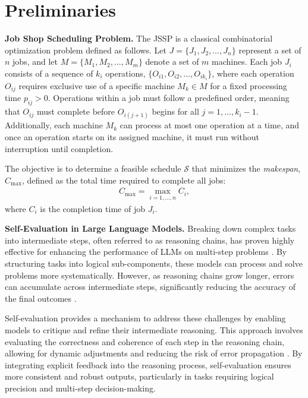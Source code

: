\section{Preliminaries}
\label{sec:preliminaries}

\textbf{Job Shop Scheduling Problem.} The JSSP is a classical combinatorial optimization problem defined as follows. Let $J = \{J_1, J_2, \dots, J_n\}$ represent a set of $n$ jobs, and let $M = \{M_1, M_2, \dots, M_m\}$ denote a set of $m$ machines. Each job $J_i$ consists of a sequence of $k_i$ operations, $\{O_{i1}, O_{i2}, \dots, O_{ik_i}\}$, where each operation $O_{ij}$ requires exclusive use of a specific machine $M_k \in M$ for a fixed processing time $p_{ij} > 0$. Operations within a job must follow a predefined order, meaning that $O_{ij}$ must complete before $O_{i(j+1)}$ begins for all $j = 1, \dots, k_i - 1$. Additionally, each machine $M_k$ can process at most one operation at a time, and once an operation starts on its assigned machine, it must run without interruption until completion.

The objective is to determine a feasible schedule $\mathcal{S}$ that minimizes the \emph{makespan}, $C_{\max}$, defined as the total time required to complete all jobs:
\begin{align}
C_{\max} = \max_{i=1, \dots, n} C_i,
\end{align}
where $C_i$ is the completion time of job $J_i$.

\textbf{Self-Evaluation in Large Language Models.} Breaking down complex tasks into intermediate steps, often referred to as reasoning chains, has proven highly effective for enhancing the performance of LLMs on multi-step problems \cite{brown2020language, wei2022chain}. By structuring tasks into logical sub-components, these models can process and solve problems more systematically. However, as reasoning chains grow longer, errors can accumulate across intermediate steps, significantly reducing the accuracy of the final outcomes \cite{chen2024self}.

Self-evaluation provides a mechanism to address these challenges by enabling models to critique and refine their intermediate reasoning. This approach involves evaluating the correctness and coherence of each step in the reasoning chain, allowing for dynamic adjustments and reducing the risk of error propagation \cite{madaan2024self}. By integrating explicit feedback into the reasoning process, self-evaluation ensures more consistent and robust outputs, particularly in tasks requiring logical precision and multi-step decision-making.
